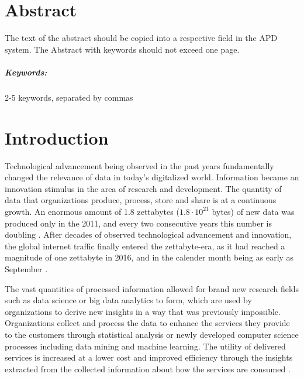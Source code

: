 \documentclass[a4paper,twoside,12pt]{book}
\newcounter{PagesWithoutNumbers}
\begin{document}
\cleardoublepage
 

\rmfamily
\normalfont



\pagestyle{onlyPageNumbers}
\tableofcontents

\setcounter{PagesWithoutNumbers}{\value{page}}
\mainmatter
\pagestyle{empty}

\chapter*{Abstract}

The text of the abstract should be copied into a respective field in the APD system. The Abstract with keywords should not exceed one page.

\paragraph{Keywords:} 2-5 keywords, separated by commas



\cleardoublepage


\pagestyle{PageNumbersChapterTitles}



\chapter{Introduction}

Technological advancement being observed in the past years fundamentally changed the relevance of data in today's digitalized world. Information became an innovation stimulus in the area of research and development. The quantity of data that organizations produce, process, store and share is at a continuous growth. An enormous amount of 1.8 zettabytes ($1.8 \cdot 10^{21}$ bytes) of new data was produced only in the 2011, and every two consecutive years this number is doubling \cite{bib:big_data_security}. After decades of observed technological advancement and innovation, the global internet traffic finally entered the zettabyte-era, as it had reached a magnitude of one zettabyte in 2016, and in the calender month being as early as September \cite{bib:cisco_blog}.

The vast quantities of processed information allowed for brand new research fields such as data science or big data analytics to form, which are used by organizations to derive new insights in a way that was previously impossible. Organizations collect and process the data to enhance the services they provide to the customers through statistical analysis or newly developed computer science processes including data mining and machine learning. The utility of delivered services is increased at a lower cost and improved efficiency through the insights extracted from the collected information about how the services are consumed \cite{bib:anonymization_pipeline}.
\end{document}
